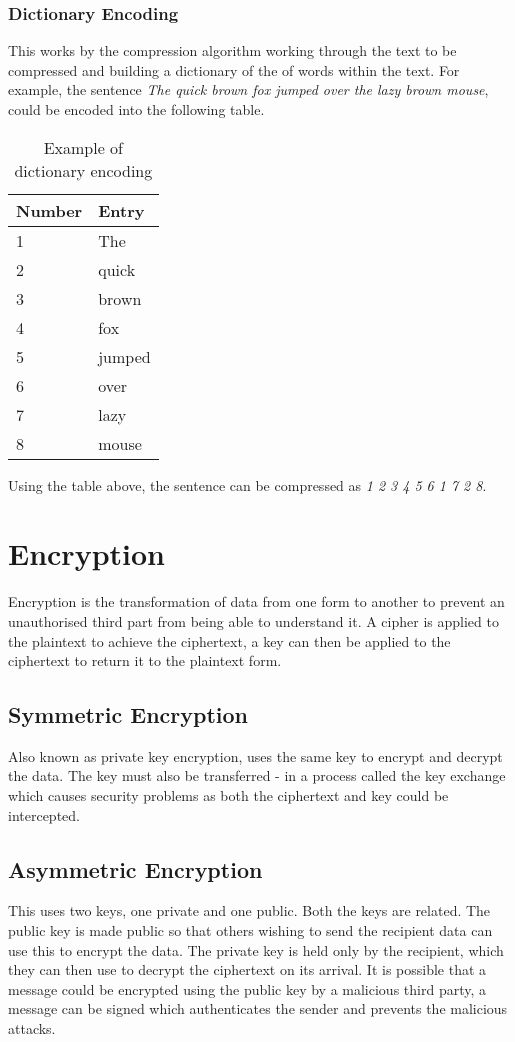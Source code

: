 \documentclass[a4paper,11pt, twocolumn]{article}
\begin{document}
\subsubsection{Dictionary Encoding}
This works by the compression algorithm working through the text to be compressed and building a dictionary of the of words within the text. For example, the sentence \textit{The quick brown fox jumped over the lazy brown mouse}, could be encoded into the following table.
\begin{table}[H]
    \centering
    \begin{tabularx}{0.45\textwidth}{X|X}
        Number & Entry \\
        \hline
        1 & The\\
        2 & quick\\
        3 & brown\\
        4 & fox\\
        5 & jumped\\
        6 & over\\
        7 & lazy\\
        8 & mouse
    \end{tabularx}
    \caption{Example of dictionary encoding}
    \label{tab:dictionaryEncodingExample}
\end{table}
\noindent Using the table above, the sentence can be compressed as \textit{1 2 3 4 5 6 1 7 2 8}.

\section{Encryption}
Encryption is the transformation of data from one form to another to prevent an unauthorised third part from being able to understand it. A cipher is applied to the plaintext to achieve the ciphertext, a key can then be applied to the ciphertext to return it to the plaintext form.
\subsection{Symmetric Encryption}
Also known as private key encryption, uses the same key to encrypt and decrypt the data. The key must also be transferred - in a process called the key exchange which causes security problems as both the ciphertext and key could be intercepted.
\subsection{Asymmetric Encryption}
This uses two keys, one private and one public. Both the keys are related. The public key is made public so that others wishing to send the recipient data can use this to encrypt the data. The private key is held only by the recipient, which they can then use to decrypt the ciphertext on its arrival. It is possible that a message could be encrypted using the public key by a malicious third party, a message can be signed which authenticates the sender and prevents the malicious attacks.
\end{document}

